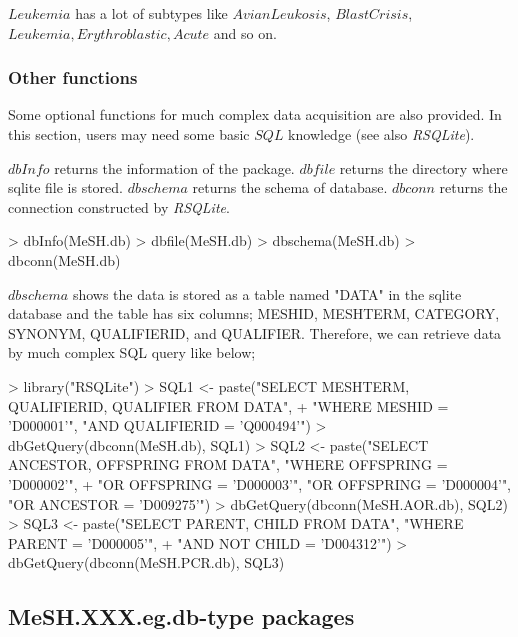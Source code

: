 \documentclass[11pt]{article}
\newcommand{\Rpackage}[1]{{\textit{#1}}}
\begin{document}
$Leukemia$ has a lot of subtypes like $Avian Leukosis$, $Blast Crisis$, $Leukemia, Erythroblastic, Acute$ and so on.

\clearpage
\subsubsection{Other functions}
Some optional functions for much complex data acquisition are also provided. In this section, users may need some basic $SQL$ knowledge (see also \Rpackage{RSQLite}).

$dbInfo$ returns the information of the package. $dbfile$ returns the directory where sqlite file is stored. $dbschema$ returns the schema of database. $dbconn$ returns the connection constructed by \Rpackage{RSQLite}.
\begin{center}
\begin{Schunk}
\begin{Sinput}
> dbInfo(MeSH.db)
> dbfile(MeSH.db)
> dbschema(MeSH.db)
> dbconn(MeSH.db)
\end{Sinput}
\end{Schunk}
\end{center}

$dbschema$ shows the data is stored as a table named "DATA" in the sqlite database and the table has six columns; MESHID, MESHTERM, CATEGORY, SYNONYM, QUALIFIERID, and QUALIFIER. Therefore, we can retrieve data by much complex SQL query like below;
\begin{center}
\begin{Schunk}
\begin{Sinput}
> library("RSQLite")
> SQL1 <- paste("SELECT MESHTERM, QUALIFIERID, QUALIFIER FROM DATA", 
+     "WHERE MESHID = 'D000001'", "AND QUALIFIERID = 'Q000494'")
> dbGetQuery(dbconn(MeSH.db), SQL1)
> SQL2 <- paste("SELECT ANCESTOR, OFFSPRING FROM DATA", "WHERE OFFSPRING = 'D000002'", 
+     "OR OFFSPRING = 'D000003'", "OR OFFSPRING = 'D000004'", "OR ANCESTOR = 'D009275'")
> dbGetQuery(dbconn(MeSH.AOR.db), SQL2)
> SQL3 <- paste("SELECT PARENT, CHILD FROM DATA", "WHERE PARENT = 'D000005'", 
+     "AND NOT CHILD = 'D004312'")
> dbGetQuery(dbconn(MeSH.PCR.db), SQL3)
\end{Sinput}
\end{Schunk}
\end{center}

\clearpage
\subsection{MeSH.XXX.eg.db-type packages}
\end{document}
